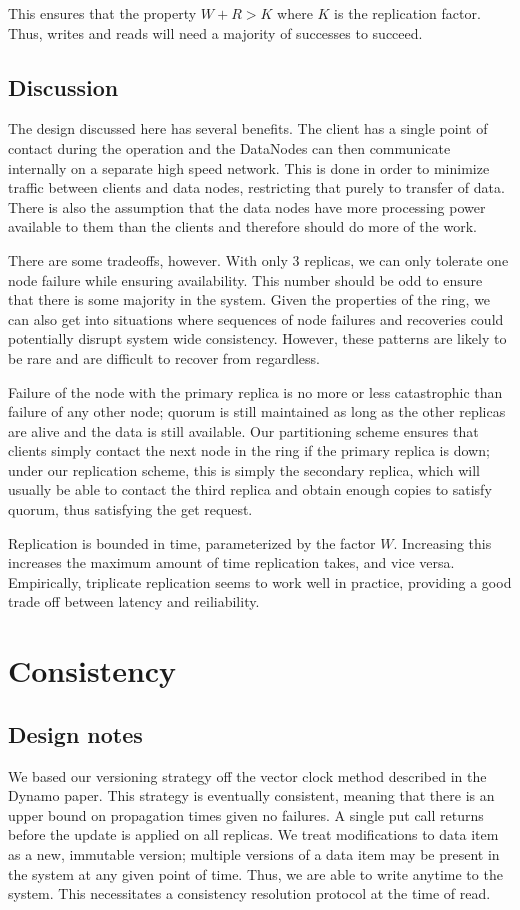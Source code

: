\documentclass[paper=a4,fontsize=11pt]{report} %
\numberwithin{equation}{section} %
\numberwithin{figure}{section} %
\numberwithin{table}{section} %
\begin{document}
This ensures that the property $W + R > K$ where $K$ is the replication factor. Thus, writes and reads will need a majority of successes to succeed.

\subsection{Discussion}
The design discussed here has several benefits. The client has a single point of contact during the operation and the DataNodes can then communicate internally on a separate high speed network. This is done in order to minimize traffic between clients and data nodes, restricting that purely to transfer of data. There is also the assumption that the data nodes have more processing power available to them than the clients and therefore should do more of the work.

There are some tradeoffs, however. With only 3 replicas, we can only tolerate one node failure while ensuring availability. This number should be odd to ensure that there is some majority in the system. Given the properties of the ring, we can also get into situations where sequences of node failures and recoveries could potentially disrupt system wide consistency. However, these patterns are likely to be rare and are difficult to recover from regardless.

Failure of the node with the primary replica is no more or less catastrophic than failure of any other node; quorum is still maintained as long as the other replicas are alive and the data is still available. Our partitioning scheme ensures that clients simply contact the next node in the ring if the primary replica is down; under our replication scheme, this is simply the secondary replica, which will usually be able to contact the third replica and obtain enough copies to satisfy quorum, thus satisfying the get request.

Replication is bounded in time, parameterized by the factor $W$. Increasing this increases the maximum amount of time replication takes, and vice versa. Empirically, triplicate replication seems to work well in practice, providing a good trade off between latency and reiliability.

\section{Consistency}

\subsection{Design notes}
We based our versioning strategy off the vector clock method described in the Dynamo paper. This strategy is eventually consistent, meaning that there is an upper bound on propagation times given no failures. A single put call returns before the update is applied on all replicas. We treat modifications to data item as a new, immutable version; multiple versions of a data item may be present in the system at any given point of time. Thus, we are able to write anytime to the system. This necessitates a consistency resolution protocol at the time of read.
\end{document}
